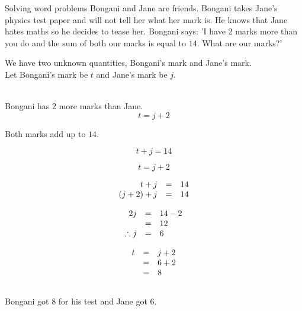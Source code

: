 \begin{wex}{Solving word problems}{
Bongani and Jane are friends. Bongani takes Jane's physics test paper and will not tell her what her mark is. 
He knows that Jane hates maths so he decides to tease her. Bongani says: 'I have $2$ marks more than you do and the sum of both our marks is equal to $14$. 
What are our marks?'}
{
We have two unknown quantities, Bongani's mark and
 Jane's mark. 
\\Let Bongani's mark be $t$ and Jane's mark be $j$. 

\\Bongani has $2$ more marks than Jane.
\begin{equation*}
t=j+2
\end{equation*}

Both marks add up to $14$.

\begin{equation*}
t+j=14
\end{equation*}

\begin{equation*}
t=j+2
\end{equation*}

\begin{equation*}
    \begin{array}{ccc}\hfill t+j& =& 14\hfill \\
	\hfill (j+2)+j& =& 14\hfill \\

    \end{array}
\end{equation*}

\begin{equation*}
    \begin{array}{ccl}\hfill 2j& =& 14 - 2\hfill \\
	\hfill & =& 12\hfill \\
\hfill \therefore j &=& 6 \hfill

    \end{array}
\end{equation*}

\begin{equation*}
\begin{array}{ccl}\hfill t& =& j+2\hfill \\ & =& 6+2\hfill \\ & =& 8\hfill \end{array}
\end{equation*}
\\
Bongani got $8$ for his test and Jane got  $6$.\\
}
\end{wex}

